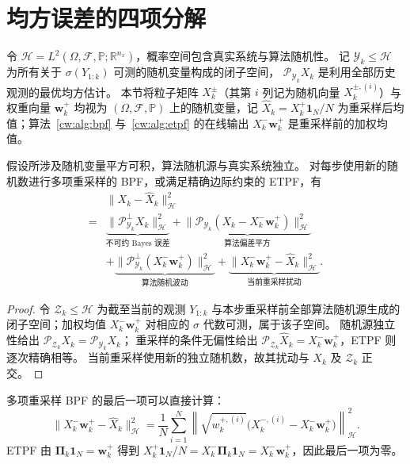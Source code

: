 \section{均方误差的四项分解}\label{cw:sec:algorithm-errors}
令 $\mathcal H=L^2(\Omega,\mathcal F,\mathbb P;\mathbb R^{n_x})$，概率空间包含真实系统与算法随机性。
记 $\mathcal Y_k\leqslant\mathcal H$ 为所有关于 $\sigma(Y_{1:k})$ 可测的随机变量构成的闭子空间，
$\mathscr P_{\mathcal Y_k}X_k$ 是利用全部历史观测的最优均方估计。
本节将粒子矩阵 $X_k^\pm$（其第 $i$ 列记为随机向量 $X_k^{\pm,(i)}$）与权重向量 $\bm w_k^+$ 均视为 $(\Omega,\mathcal F,\mathbb P)$ 上的随机变量，记 $\hat X_k=X_k^+\mathbf1_N/N$ 为重采样后均值；算法~\ref{cw:alg:bpf} 与~\ref{cw:alg:etpf} 的在线输出 $X_k^-\bm w_k^+$ 是重采样前的加权均值。

\begin{theorem}[四项误差分解]\label{cw:thm:four-errors}
假设所涉及随机变量平方可积，算法随机源与真实系统独立。
对每步使用新的随机数进行多项重采样的 BPF，或满足精确边际约束的 ETPF，有
\begin{equation}\label{cw:eq:four-errors}
\begin{aligned}
&\|X_k-\hat X_k\|_{\mathcal H}^2\\
= &\underbrace{\|\mathscr P_{\mathcal Y_k}^{\perp}X_k\|_{\mathcal H}^2}_{\text{不可约 Bayes 误差}}
+\underbrace{\|\mathscr P_{\mathcal Y_k}(X_k-X_k^-\bm w_k^+)\|_{\mathcal H}^2}_{\text{算法偏差平方}}\\
&+\underbrace{\|\mathscr P_{\mathcal Y_k}^{\perp}(X_k^-\bm w_k^+)\|_{\mathcal H}^2}_{\text{算法随机波动}}
+\underbrace{\|X_k^-\bm w_k^+-\hat X_k\|_{\mathcal H}^2}_{\text{当前重采样扰动}}.
\end{aligned}
\end{equation}
\end{theorem}
\begin{proof}
令 $\mathcal Z_k\leqslant\mathcal H$ 为截至当前的观测 $Y_{1:k}$ 与本步重采样前全部算法随机源生成的闭子空间；加权均值 $X_k^-\bm w_k^+$ 对相应的 $\sigma$ 代数可测，属于该子空间。
随机源独立性给出 $\mathscr P_{\mathcal Z_k}X_k=\mathscr P_{\mathcal Y_k}X_k$；
重采样的条件无偏性给出 $\mathscr P_{\mathcal Z_k}\hat X_k=X_k^-\bm w_k^+$，ETPF 则逐次精确相等。
当前重采样使用新的独立随机数，故其扰动与 $X_k$ 及 $\mathcal Z_k$ 正交。
\end{proof}

多项重采样 BPF 的最后一项可以直接计算：
\begin{equation}\label{cw:eq:bpf-resampling-error}
\|X_k^-\bm w_k^+-\hat X_k\|_{\mathcal H}^2
=\frac1N\sum_{i=1}^N\left\|\sqrt{w_k^{+,(i)}}\bigl(X_k^{-,(i)}-X_k^-\bm w_k^+\bigr)\right\|_{\mathcal H}^2.
\end{equation}
ETPF 由 $\bm\Pi_k\mathbf1_N=\bm w_k^+$ 得到
$X_k^+\mathbf1_N/N=X_k^-\bm\Pi_k\mathbf1_N=X_k^-\bm w_k^+$，因此最后一项为零。

